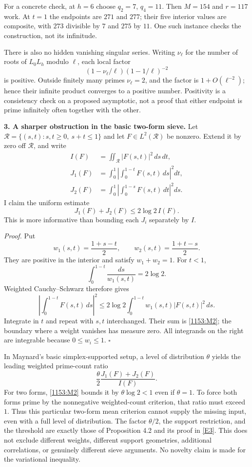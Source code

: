 \documentclass[11pt,a4paper]{article}
\newcommand{\eref}[2]{\hyperlink{extra:#1:#2}{[E#2]}}
\numberwithin{equation}{section}
\begin{document}
For a concrete check, at $h=6$ choose $q_2=7$, $q_4=11$. Then $M=154$ and
$r=117$ work. At $t=1$ the endpoints are $271$ and $277$; their five interior
values are composite, with $273$ divisible by $7$ and $275$ by $11$.
One such instance checks the construction, not its infinitude.

There is also no hidden vanishing singular series. Writing $\nu_\ell$ for
the number of roots of $L_0L_h$ modulo $\ell$, each local factor
\[
 (1-\nu_\ell/\ell)(1-1/\ell)^{-2}
\]
is positive. Outside finitely many primes $\nu_\ell=2$, and the factor is
$1+O(\ell^{-2})$; hence their infinite product converges to a positive
number. Positivity is a consistency check on a proposed asymptotic, not a
proof that either endpoint is prime infinitely often together with the other.

\medskip
\textbf{3. A sharper obstruction in the basic two-form sieve.}
Let $\mathcal R=\{(s,t):s,t\geq0,\ s+t\leq1\}$ and let $F\in L^2(\mathcal R)$
be nonzero. Extend it by zero off $\mathcal R$, and write
\begin{align*}
 I(F)&=\iint_{\mathcal R}|F(s,t)|^2\,ds\,dt,\\
 J_1(F)&=\int_0^1\left|\int_0^{1-t}F(s,t)\,ds\right|^2dt,\\
 J_2(F)&=\int_0^1\left|\int_0^{1-s}F(s,t)\,dt\right|^2ds.
\end{align*}
I claim the uniform estimate
\begin{equation}\label{1153:M2}
 J_1(F)+J_2(F)\leq2\log2\,I(F).
\end{equation}
This is more informative than bounding each $J_i$ separately by $I$.

\emph{Proof.} Put
\[
 w_1(s,t)=\frac{1+s-t}{2},\qquad
 w_2(s,t)=\frac{1+t-s}{2}.
\]
They are positive in the interior and satisfy $w_1+w_2=1$. For $t<1$,
\[
 \int_0^{1-t}\frac{ds}{w_1(s,t)}=2\log2.
\]
Weighted Cauchy--Schwarz therefore gives
\[
 \left|\int_0^{1-t}F(s,t)\,ds\right|^2
 \leq2\log2\int_0^{1-t}w_1(s,t)|F(s,t)|^2\,ds.
\]
Integrate in $t$ and repeat with $s,t$ interchanged. Their sum is
\eqref{1153:M2}; the boundary where a weight vanishes has measure zero.
All integrands on the right are integrable because $0\leq w_i\leq1$.
$\square$

In Maynard's basic simplex-supported setup, a level of distribution $\theta$
yields the leading weighted prime-count ratio
\[
 \frac{\theta}{2}\frac{J_1(F)+J_2(F)}{I(F)}.
\]
For two forms, \eqref{1153:M2} bounds it by $\theta\log2<1$ even if
$\theta=1$. To force both forms prime by the nonnegative weighted-count
criterion, that ratio must exceed $1$. Thus this particular two-form mean
criterion cannot supply the missing input, even with a full level of
distribution. The factor $\theta/2$, the support restriction, and the
threshold are exactly those of Proposition 4.2 and its proof in
\eref{1153}{3}. This does not exclude different weights, different support
geometries, additional correlations, or genuinely different sieve arguments.
No novelty claim is made for the variational inequality.
\end{document}
